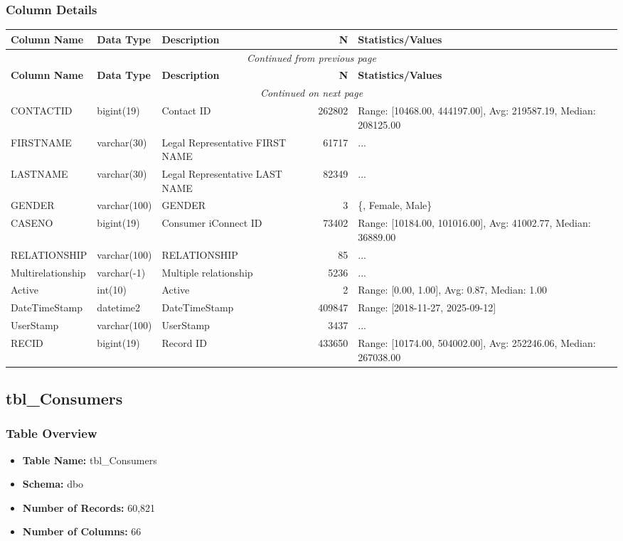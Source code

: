 \begin{landscape}
\subsubsection{Column Details}
\begin{longtable}{|l|l|l|r|p{6cm}|}
\hline
\textbf{Column Name} & \textbf{Data Type} & \textbf{Description} & \textbf{N} & \textbf{Statistics/Values} \\
\hline
\endfirsthead
\multicolumn{5}{c}{\textit{Continued from previous page}} \\
\hline
\textbf{Column Name} & \textbf{Data Type} & \textbf{Description} & \textbf{N} & \textbf{Statistics/Values} \\
\hline
\endhead
\hline
\multicolumn{5}{c}{\textit{Continued on next page}} \\
\endfoot
\hline
\endlastfoot
CONTACTID & bigint(19) & Contact ID & 262802 & Range: [10468.00, 444197.00], Avg: 219587.19, Median: 208125.00 \\
\hline
FIRSTNAME & varchar(30) & Legal Representative FIRST NAME & 61717 & ... \\
\hline
LASTNAME & varchar(30) & Legal Representative LAST NAME & 82349 & ... \\
\hline
GENDER & varchar(100) & GENDER & 3 & \{, Female, Male\} \\
\hline
CASENO & bigint(19) & Consumer iConnect ID & 73402 & Range: [10184.00, 101016.00], Avg: 41002.77, Median: 36889.00 \\
\hline
RELATIONSHIP & varchar(100) & RELATIONSHIP & 85 & ... \\
\hline
Multirelationship & varchar(-1) & Multiple relationship & 5236 & ... \\
\hline
Active & int(10) & Active & 2 & Range: [0.00, 1.00], Avg: 0.87, Median: 1.00 \\
\hline
DateTimeStamp & datetime2 & DateTimeStamp & 409847 & Range: [2018-11-27, 2025-09-12] \\
\hline
UserStamp & varchar(100) & UserStamp & 3437 & ... \\
\hline
RECID & bigint(19) & Record ID & 433650 & Range: [10174.00, 504002.00], Avg: 252246.06, Median: 267038.00 \\
\hline
\end{longtable}

\subsection{tbl\_Consumers}

\subsubsection{Table Overview}
\begin{itemize}
\item \textbf{Table Name:} tbl\_Consumers
\item \textbf{Schema:} dbo
\item \textbf{Number of Records:} 60,821
\item \textbf{Number of Columns:} 66
\end{itemize}


\end{landscape}
